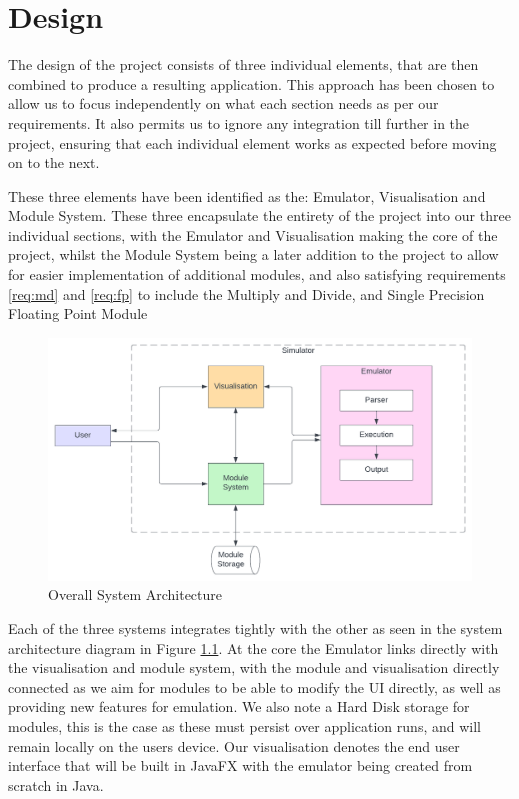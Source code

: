 

\chapter{Design}
\label{ch:design}
The design of the project consists of three individual elements, that are then combined to produce a resulting application. This approach has been chosen to allow us to focus independently on what each section needs as per our requirements. It also permits us to ignore any integration till further in the project, ensuring that each individual element works as expected before moving on to the next.

These three elements have been identified as the: Emulator, Visualisation and Module System. These three encapsulate the entirety of the project into our three individual sections, with the Emulator and Visualisation making the core of the project, whilst the Module System being a later addition to the project to allow for easier implementation of additional modules, and also satisfying requirements \ref{req:md} and \ref{req:fp} to include the Multiply and Divide, and Single Precision Floating Point Module


\begin{figure}[h]
    \centering
    \includegraphics[width=0.95\linewidth]{dissertation/DATA/sys architecture.png}
    \caption{Overall System Architecture}
    \label{fig:sys_architecture}
\end{figure}

Each of the three systems integrates tightly with the other as seen in the system architecture diagram in Figure \ref{fig:sys_architecture}. At the core the Emulator links directly with the visualisation and module system, with the module and visualisation directly connected as we aim for modules to be able to modify the UI directly, as well as providing new features for emulation. We also note a Hard Disk storage for modules, this is the case as these must persist over application runs, and will remain locally on the users device. Our visualisation denotes the end user interface that will be built in JavaFX with the emulator being created from scratch in Java.

